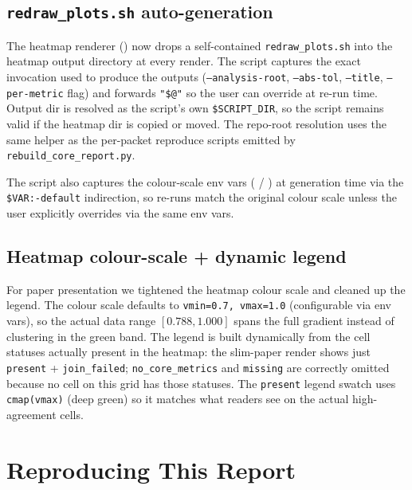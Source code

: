 \documentclass[11pt]{article}
\begin{document}
\subsection{\texorpdfstring{\texttt{redraw\_plots.sh}}{redraw\_plots.sh} auto-generation}
\label{sec:tr-tooling-redraw-plots}

The heatmap renderer
  () now drops a
  self-contained \texttt{redraw\_plots.sh} into the heatmap output
  directory at every render.
The script captures the exact invocation used to produce the
  outputs (\texttt{--analysis-root}, \texttt{--abs-tol},
  \texttt{--title}, \texttt{--per-metric} flag) and forwards
  \texttt{"\$@"} so the user can override at re-run time.
Output dir is resolved as the script's own \texttt{\$SCRIPT\_DIR},
  so the script remains valid if the heatmap dir is copied or moved.
The repo-root resolution uses the same
   helper as the per-packet
  reproduce scripts emitted by \texttt{rebuild\_core\_report.py}.

The script also captures the colour-scale env vars
  ( /
  ) at generation time via the
  \texttt{\${VAR:-default}} indirection, so re-runs match the
  original colour scale unless the user explicitly overrides via the
  same env vars.

\subsection{Heatmap colour-scale + dynamic legend}
\label{sec:tr-tooling-heatmap-ux}

For paper presentation we tightened the heatmap colour scale and
  cleaned up the legend.
The colour scale defaults to \texttt{vmin=0.7, vmax=1.0} (configurable
  via env vars), so the actual data range $[0.788, 1.000]$ spans the
  full gradient instead of clustering in the green band.
The legend is built dynamically from the cell statuses actually
  present in the heatmap: the slim-paper render shows just
  \texttt{present} + \texttt{join\_failed}; \texttt{no\_core\_metrics}
  and \texttt{missing} are correctly omitted because no cell on this
  grid has those statuses.
The \texttt{present} legend swatch uses \texttt{cmap(vmax)} (deep
  green) so it matches what readers see on the actual high-agreement
  cells.


\section{Reproducing This Report}
\label{sec:tr-reproduce}
\end{document}
